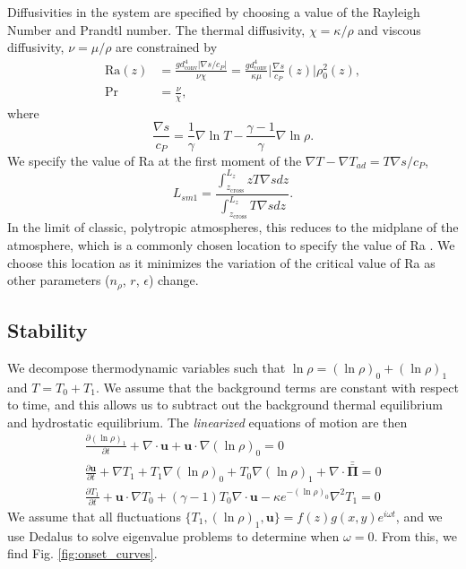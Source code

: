 \documentclass[titlepage, twocolumn, fontsize=10]{aastex6}
\newcommand{\grad}{\ensuremath{\nabla}}
\newcommand{\stressT}{\ensuremath{\bm{\bar{\bar{\Pi}}}}}
\begin{document}
Diffusivities in the system are specified by choosing a value of the Rayleigh
Number and Prandtl number.  The thermal diffusivity, $\chi = \kappa / \rho$ and
viscous diffusivity, $\nu = \mu / \rho$ are constrained by
\begin{equation}
\begin{split}
\text{Ra}(z) &= \frac{g d_{\text{conv}}^4 \bigg|\grad s / c_P\bigg|}{\nu\chi} = 
\frac{g d_{\text{conv}}^4}{\kappa\mu}\bigg|\frac{\grad s}{c_P}(z)\bigg|\rho_0^2(z),\\
\text{Pr} &= \frac{\nu}{\chi},
\end{split}
\end{equation}
where 
\begin{equation}
\frac{\grad s}{c_P} = \frac{1}{\gamma} \grad\ln T - \frac{\gamma-1}{\gamma} \grad \ln \rho.
\end{equation}
We specify the value of Ra at the first moment of the $\grad T - \grad T_{ad} = T \grad s / c_P$,
\begin{equation}
L_{sm1} = \frac{\int_{z_{\text{cross}}}^{L_z} z T\grad s dz}{\int_{z_{\text{cross}}}^{L_z} T\grad s dz}.
\end{equation}
In the limit of classic, polytropic atmospheres, this reduces to the midplane of the atmosphere,
which is a commonly chosen location to specify the value of Ra \citep{hurlburt&all1984}.  We choose this location as it
minimizes the variation of the critical value of Ra as other parameters ($n_\rho$, $r$, $\epsilon$)
change.

\subsection{Stability}
We decompose thermodynamic variables such that $\ln\rho = (\ln\rho)_0 + (\ln\rho)_1$
and $T = T_0 + T_1$.  We assume that the background terms are constant with respect to
time, and this allows us to subtract out the background thermal equilibrium and
hydrostatic equilibrium.  The \emph{linearized} equations of motion are then
\begin{equation}
\begin{split}
\frac{\partial (\ln\rho)_1}{\partial t} + \grad\cdot\bm{u} + \bm{u}\cdot\grad(\ln\rho)_0 = 0 \\
\frac{\partial \bm{u}}{\partial t} + \grad T_1 + T_1 \grad(\ln\rho)_0 + T_0 \grad(\ln\rho)_1
+ \grad \cdot\stressT = 0 \\
\frac{\partial T_1}{\partial t} + \bm{u}\cdot\grad T_0 + (\gamma-1)T_0\grad\cdot\bm{u} - \kappa e^{-(\ln\rho)_0}
\grad^2 T_1 = 0
\end{split}
\end{equation}
We assume that all fluctuations $\{ T_1, (\ln\rho)_1, \bm{u} \} = f(z) g(x, y) e^{i\omega t}$, and we
use Dedalus to solve eigenvalue problems to determine when $\omega = 0$.  From this, we find
Fig. \ref{fig:onset_curves}.
\end{document}
